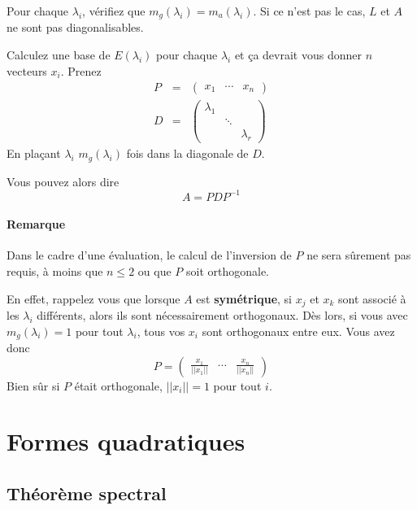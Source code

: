 Pour chaque $\lambda_i$, vérifiez que $m_g(\lambda_i) = m_a(\lambda_i)$. Si ce n'est pas le cas, $L$ et $A$ ne sont pas diagonalisables.

Calculez une base de $E(\lambda_i)$ pour chaque $\lambda_i$ et ça devrait vous donner $n$ vecteurs $x_i$.
Prenez
\begin{eqnarray*}
	P &=& \begin{pmatrix}x_1 & \cdots & x_n\end{pmatrix}\\
	D &=&
	\begin{pmatrix}
		\lambda_1 & &\\
		&\ddots&\\
		&&\lambda_r
	\end{pmatrix}
\end{eqnarray*}
En plaçant $\lambda_i$ $m_g(\lambda_i)$ fois dans la diagonale de $D$.

Vous pouvez alors dire
\[ A = PDP^{-1} \]

\paragraph{Remarque}
Dans le cadre d'une évaluation, le calcul de l'inversion de $P$ ne sera sûrement pas requis, à moins que $n \leq 2$ ou que $P$ soit orthogonale.

En effet, rappelez vous que lorsque $A$ est \textbf{symétrique}, si $x_j$ et $x_k$ sont associé à les $\lambda_i$ différents, alors ils sont nécessairement orthogonaux.
Dès lors, si vous avec $m_g(\lambda_i) = 1$ pour tout $\lambda_i$, tous vos $x_i$ sont orthogonaux entre eux.
Vous avez donc
\[
P =
\begin{pmatrix}
	\frac{x_1}{||x_1||} & \cdots & \frac{x_n}{||x_n||}
\end{pmatrix}
\]
Bien sûr si $P$ était orthogonale, $||x_i|| = 1$ pour tout $i$.


\section{Formes quadratiques}

\subsection{Théorème spectral}


